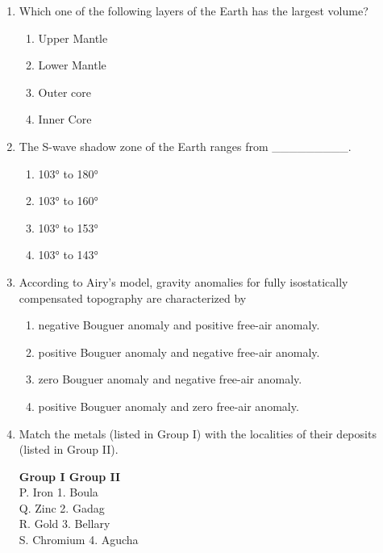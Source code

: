 \documentclass[journal,12pt,onecolumn]{IEEEtran}
\begin{document}
\begin{enumerate}
\begin{enumerate}
\item Which one of the following layers of the Earth has the largest volume?

\hfill{}

\begin{multicols}{4}
\begin{enumerate}
\item Upper Mantle
\item Lower Mantle
\item Outer core
\item Inner Core
\end{enumerate}
\end{multicols}

\item The S-wave shadow zone of the Earth ranges from \_\_\_\_\_\_\_\_\_.

\hfill{}

\begin{multicols}{4}
\begin{enumerate}
\item 103° to 180°
\item 103° to 160°
\item 103° to 153°
\item 103° to 143°
\end{enumerate}
\end{multicols}

\item According to Airy’s model, gravity anomalies for fully isostatically compensated topography are characterized by

\hfill{}


\begin{enumerate}
\item negative Bouguer anomaly and positive free-air anomaly.
\item positive Bouguer anomaly and negative free-air anomaly.
\item zero Bouguer anomaly and negative free-air anomaly.
\item positive Bouguer anomaly and zero free-air anomaly.
\end{enumerate}

\newpage


\item Match the metals (listed in Group I) with the localities of their deposits (listed in Group II).

\begin{center}
\textbf{Group I \hfill Group II} \\[6pt]
P. Iron \hfill 1. Boula \\
Q. Zinc \hfill 2. Gadag \\
R. Gold \hfill 3. Bellary \\
S. Chromium \hfill 4. Agucha \\
\end{center}


\end{enumerate}
\end{enumerate}
\end{document}
